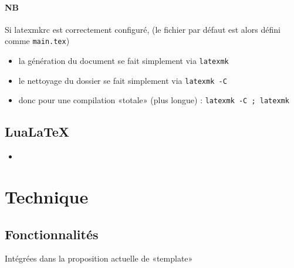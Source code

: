 \paragraph{NB}

Si latexmkrc est correctement configuré, (le fichier par défaut est alors défini comme \texttt{main.tex})
\begin{itemize}
\item la génération du document se fait simplement via \texttt{latexmk}
\item le nettoyage du dossier se fait simplement via \texttt{latexmk -C}
\item donc pour une compilation «totale» (plus longue) : \texttt{latexmk -C ; latexmk}
\end{itemize}


\subsection{LuaLaTeX}

\begin{itemize}
\item
\end{itemize}



\section{Technique}

\subsection{Fonctionnalités}

Intégrées dans la proposition actuelle de  «template»

